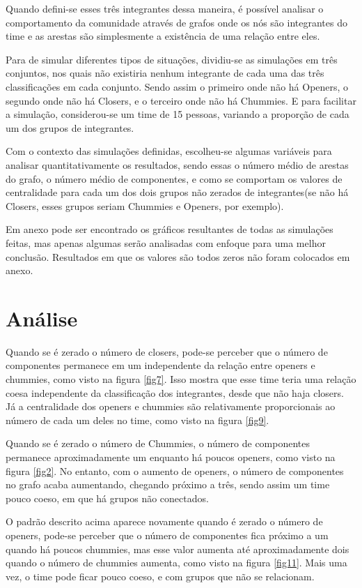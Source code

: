 \documentclass[12pt]{article}
\begin{document}
Quando defini-se esses três integrantes dessa maneira, é possível analisar o comportamento da comunidade através de grafos onde os nós são integrantes do time e as arestas são simplesmente a existência de uma relação entre eles.

Para de simular diferentes tipos de situações, dividiu-se as simulações em três conjuntos, nos quais não existiria nenhum integrante de cada uma das três classificações em cada conjunto. Sendo assim o primeiro onde não há Openers, o segundo onde não há Closers, e o terceiro onde não há Chummies. E para facilitar a simulação, considerou-se um time de 15 pessoas, variando a proporção de cada um dos grupos de integrantes.

Com o contexto das simulações definidas, escolheu-se algumas variáveis para analisar quantitativamente os resultados, sendo essas o número médio de arestas do grafo, o número médio de componentes, e como se comportam os valores de centralidade para cada um dos dois grupos não zerados de integrantes(se não há Closers, esses grupos seriam Chummies e Openers, por exemplo).

Em anexo pode ser encontrado os gráficos resultantes de todas as simulações feitas, mas apenas algumas serão analisadas com enfoque para uma melhor conclusão. Resultados em que os valores são todos zeros não foram colocados em anexo.

\section{Análise}

Quando se é zerado o número de closers, pode-se perceber que o número de componentes permanece em um independente da relação entre openers e chummies, como visto na figura \ref{fig7}. Isso mostra que esse time teria uma relação coesa independente da classificação dos integrantes, desde que não haja closers. Já a centralidade dos openers e chummies são relativamente proporcionais ao número de cada um deles no time, como visto na figura \ref{fig9}.

Quando se é zerado o número de Chummies, o número de componentes permanece aproximadamente um enquanto há poucos openers, como visto na figura \ref{fig2}. No entanto, com o aumento de openers, o número de componentes no grafo acaba aumentando, chegando próximo a três, sendo assim um time pouco coeso, em que há grupos não conectados. 

O padrão descrito acima aparece novamente quando é zerado o número de openers, pode-se perceber que o número de componentes fica próximo a um quando há poucos chummies, mas esse valor aumenta até aproximadamente dois quando o número de chummies aumenta, como visto na figura \ref{fig11}. Mais uma vez, o time pode ficar pouco coeso, e com grupos que não se relacionam.
\end{document}
